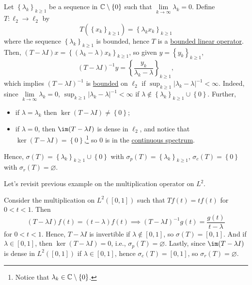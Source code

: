 \begin{eg}
	Let \(\left\{ \lambda _k \right\} _{k \geq 1}\) be a sequence in \(\mathbb{\MakeUppercase{c}} \setminus \left\{ 0 \right\} \) such that \(\lim\limits_{k \to \infty} \lambda _k = 0\). Define \(T\colon \ell _2 \to \ell _2\) by
	\[
		T(\left\{ x_k \right\} _{k\geq 1})= \left\{ \lambda_k x_k \right\} _{k\geq 1}
	\]
	where the sequence \(\left\{ \lambda _k \right\} _{k\geq 1}\) is bounded, hence \(T\) is a \hyperref[def:bounded-linear-op]{bounded linear operator}. Then, \((T-\lambda I) x = \left\{ (\lambda _k - \lambda )x_k \right\} _{k\geq 1}\), so given \(y = \left\{ y_k \right\} _{k\geq 1}\),
	\[
		(T-\lambda I)^{-1} y = \left\{ \frac{y_k}{\lambda _k - \lambda } \right\} _{k\geq 1},
	\]
	which implies \((T-\lambda I)^{-1} \) is \hyperref[rmk:bounded-op]{bounded} on \(\ell _2\) if \(\sup _{k\geq 1} \vert \lambda _k - \lambda \vert ^{-1} < \infty \). Indeed, since \(\lim\limits_{k \to \infty} \lambda _k = 0\), \(\sup _{k\geq 1} \vert \lambda _k - \lambda \vert ^{-1} < \infty\) if \(\lambda \notin \left\{ \lambda _k \right\}_{k\geq 1} \cup \left\{ 0 \right\}\). Further,
	\begin{itemize}
		\item if \(\lambda =\lambda _k\) then \(\ker(T - \lambda I) \neq \left\{ 0 \right\} \);
		\item if \(\lambda=0\), then \(\im(T - \lambda I)\) is dense in \(\ell _2\), and notice that \(\ker(T-\lambda I) = \left\{ 0 \right\} \),\footnote{Notice that \(\lambda _k \in \mathbb{\MakeUppercase{c}} \setminus \left\{ 0 \right\} \).} so \(0\) is in the \hyperref[def:continuous-spectrum]{continuous spectrum}.
	\end{itemize}

	Hence, \(\sigma (T) = \left\{ \lambda _k \right\}_{k\geq 1} \cup \left\{ 0 \right\}\) with \(\sigma _p(T) = \left\{ \lambda _k \right\}_{k\geq 1} \), \(\sigma _c(T) = \left\{ 0 \right\} \) with \(\sigma _r(T) = \varnothing \).
\end{eg}

Let's revisit previous example on the multiplication operator on \(L^2\).

\begin{eg}
	Consider the multiplication on \(L^2([0, 1])\) such that \(Tf(t) = tf(t)\) for \(0 < t < 1\). Then
	\[
		(T-\lambda I)f(t) = (t - \lambda )f(t) \implies (T-\lambda I)^{-1} g(t) = \frac{g(t)}{t - \lambda }
	\]
	for \(0 < t < 1\). Hence, \(T-\lambda I\) is invertible if \(\lambda \notin [0, 1]\), so \(\sigma (T) = [0, 1]\). And if \(\lambda \in [0, 1]\), then \(\ker(T - \lambda I) = 0\), i.e., \(\sigma _p(T)=\varnothing \). Lastly, since \(\im(T-\lambda I)\) is dense in \(L^2([0, 1])\) if \(\lambda \in [0, 1]\), hence \(\sigma _c(T) = [0, 1]\), so \(\sigma _r(T) = \varnothing \).
\end{eg}

